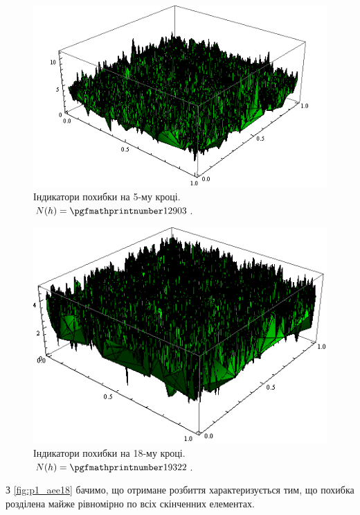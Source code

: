 \begin{figure}[H]
	\centering
    \includegraphics[scale=0.85]{problem1/my/AEE/5}
    \caption{Індикатори похибки на 5-му кроці.  $N(h) = \nn{12903}$.}
    \label{fig:p1_aee5}
\end{figure}

\begin{figure}[H]
	\centering
    \includegraphics[scale=0.85]{problem1/my/AEE/18}
    \caption{Індикатори похибки на 18-му кроці.  $N(h) = \nn{19322}$.}
    \label{fig:p1_aee18}
\end{figure}

З \autoref{fig:p1_aee18} бачимо, що отримане розбиття характеризується тим, що похибка розділена майже рівномірно по всіх скінченних елементах.

